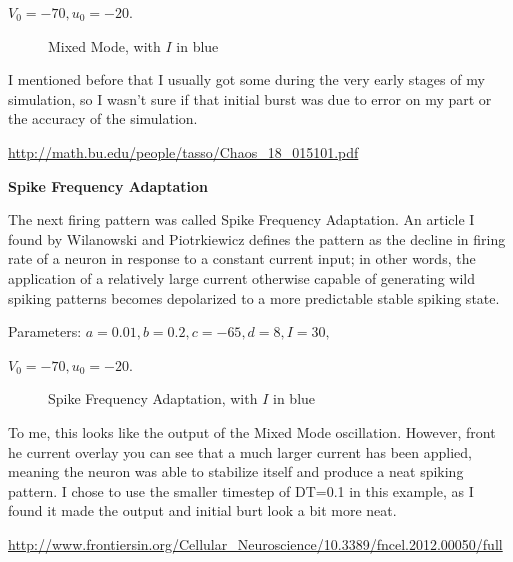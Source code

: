 \documentclass[a4paper,12pt]{article}
\begin{document}
$V_{0}=-70, u_{0}=-20$. 

\begin{figure}[h!]
\begin{center}
\end{center}
\caption{\label{pict5}Mixed Mode, with $I$ in blue}
\end{figure}

I mentioned before that I usually got some during the very early stages of my simulation, so I wasn't sure if that initial burst was due to error on my part or the accuracy of the simulation.

\url{http://math.bu.edu/people/tasso/Chaos_18_015101.pdf}

\vfil\eject

{\bf Spike Frequency Adaptation}
\bigskip

The next firing pattern was called Spike Frequency Adaptation. An article I found by Wilanowski and Piotrkiewicz defines the pattern as the decline in firing rate of a neuron in response to a constant current input; in other words, the application of a relatively large current otherwise capable of generating wild spiking patterns becomes depolarized to a more predictable stable spiking state. 

\vspace{2mm}

Parameters: $a=0.01, b=0.2, c=-65, d=8, I=30, $

\vspace{1mm}

$V_{0}=-70, u_{0}=-20$. 

\begin{figure}[h!]
\begin{center}
\end{center}
\caption{\label{pict6}Spike Frequency Adaptation, with $I$ in blue}
\end{figure}

To me, this looks like the output of the Mixed Mode oscillation. However, front he current overlay you can see that a much larger current has been applied, meaning the neuron was able to stabilize itself and produce a neat spiking pattern. I chose to use the smaller timestep of DT=0.1 in this example, as I found it made the output and initial burt look a bit more neat. 

\url{http://www.frontiersin.org/Cellular_Neuroscience/10.3389/fncel.2012.00050/full}

\vfil\eject
\end{document}
